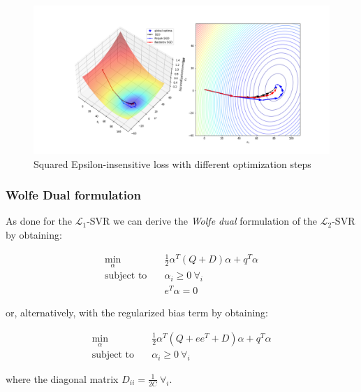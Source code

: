 \begin{figure}[h!]
	\centering
  	\includegraphics[scale=0.4]{img/l2_svr_loss}
  	\caption{Squared Epsilon-insensitive loss with different optimization steps}
  	\label{fig:l2_svr_loss}
\end{figure}

\subsubsection{Wolfe Dual formulation}

As done for the $\mathcal{L}_1$-SVR we can derive the \emph{Wolfe dual} formulation of the $\mathcal{L}_2$-SVR by obtaining:

\begin{equation} \label{eq:wolfe_dual_l2_svr}
    \begin{aligned}
        \min_{\alpha} \quad & \frac{1}{2} \alpha^T (Q + D) \alpha + q^T \alpha \\
            \text{subject to} \quad & \alpha_i \geq 0 \ \forall_i \\ & e^T \alpha=0
    \end{aligned}
\end{equation}

or, alternatively, with the regularized bias term by obtaining:

\begin{equation} \label{eq:reg_bias_wolfe_dual_l2_svr}
    \begin{aligned}
        \min_{\alpha} \quad & \frac{1}{2}\alpha^T (Q + ee^T + D) \alpha + q^T \alpha \\
            \text{subject to} \quad & \alpha_i \geq 0 \ \forall_i
    \end{aligned}
\end{equation}

where the diagonal matrix $\displaystyle D_{ii} = \frac{1}{2C} \ \forall_i$.

